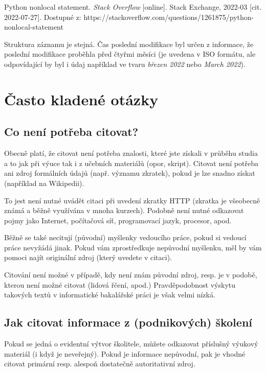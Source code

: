 \documentclass[male,czech,api_bc]{kitheses}
\begin{document}
Python nonlocal statement. \textit{Stack Overflow} [online]. Stack Exchange, 2022-03 [cit. 2022-07-27]. Dostupné z: https://stackoverflow.com/questions/1261875/python-nonlocal-statement

Struktura záznamu je stejná. Čas poslední modifikace byl určen z informace, že poslední modifikace proběhla před čtyřmi měsíci (je uvedena v ISO formátu, ale odpovídající by byl i údaj například ve tvaru \textit{březen 2022} nebo \textit{March 2022}).


\section{Často kladené otázky}

\subsection{Co není potřeba citovat?}

Obecně platí, že citovat není potřeba znalosti, které jste získali v průběhu studia a to jak při výuce tak i z učebních materiálů (opor, skript). Citovat není potřeba ani zdroj formálních údajů (např. významu zkratek), pokud je lze snadno získat (například na Wikipedii).

To jest není nutné uvádět citaci při uvedení zkratky HTTP (zkratka je všeobecně známá a běžně využívána v mnoha kurzech). Podobně není nutné odkazovat pojmy jako Internet, počítačová síť, programovací jazyk, procesor, apod.

Běžně se také necitují (původní) myšlenky vedoucího práce, pokud si vedoucí práce nevyžádá jinak. Pokud vám zprostředkuje nepůvodní myšlenku, měl by vám pomoci najít originální zdroj (který uvedete v citaci).

Citování není možné v případě, kdy není znám původní zdroj, resp. je v podobě, kterou není možné citovat (lidová řčení, apod.) Pravděpodobnost výskytu takových textů v informatické bakalářské práci je však velmi nízká.

\subsection{Jak citovat informace z (podnikových) školení}

Pokud se jedná o evidentní výtvor školitele, můžete odkazovat příslušný
výukový materiál (i když je neveřejný). Pokud je informace nepůvodní, pak je vhodné citovat primární resp. alespoň dostatečně autoritativní zdroj.
\end{document}
